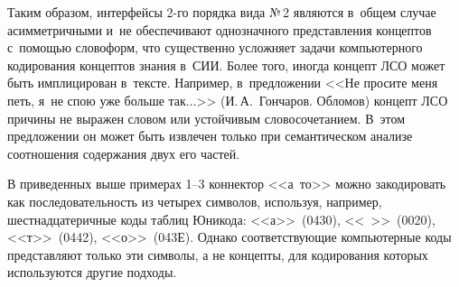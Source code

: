 \begin{multicols}{2}
  Таким образом, интерфейсы 2-го порядка вида №\,2 являются в~общем случае 
асимметричными и~не обеспечивают однозначного представления концептов 
с~помощью словоформ, что существенно усложняет задачи компьютерного 
кодирования концептов знания в~СИИ. Более того, иногда концепт ЛСО может 
быть имплицирован в~тексте. Например, в~предложении <<Не просите меня 
петь, я~не спою уже больше так$\ldots$>> (И.\,А.~Гончаров. Обломов) концепт 
ЛСО причины не выражен словом или устойчивым словосочетанием. В~этом 
предложении он может быть извлечен только при семантическом анализе 
соотношения содержания двух его частей.

  
  В приведенных выше примерах 1--3 коннектор <<а~то>> можно 
закодировать как последовательность из четырех символов, используя, 
например, шестнадцатеричные коды таблиц Юникода: <<а>>~(0430), <<\ 
>>~(0020), <<т>>~(0442), <<о>>~(043Е). Однако соответствующие 
компьютерные коды представляют только эти символы, а не концепты, для 
кодирования которых используются другие подходы.


\end{multicols}
